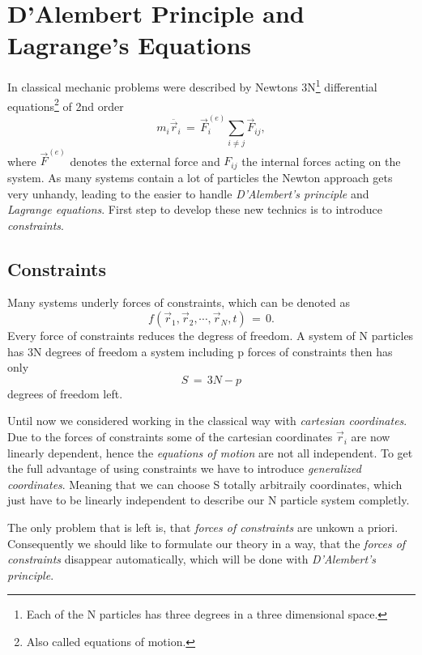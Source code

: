 \chapter{D'Alembert Principle and Lagrange's Equations}
In classical mechanic problems were described by Newtons 3N\footnote{Each of
the N particles has three degrees in a three dimensional space.} differential
equations\footnote{Also called equations of motion.} of 2nd order 
\begin{equation}
  m_i \ddot{\vec r_i} \,=\, \vec F_i^{(e)} \sum_{i \neq j} \vec F_{ij},
\end{equation}
where $\vec F^{(e)}$ denotes the external force and $F_{ij}$ the internal forces
acting on the system. As many systems contain a lot of particles the Newton
approach gets very unhandy, leading to the easier to handle \textit{D'Alembert's
principle} and \textit{Lagrange equations}. First step to develop these new
technics is to introduce \textit{constraints}. 

\section{Constraints}
Many systems underly forces of constraints, which can be denoted as 
\begin{equation}
  \label{holonomicConstraint}
  f(\vec r_1, \vec r_2, \cdots, \vec r_N, t) \,=\, 0.
\end{equation}
Every force of constraints reduces the degress of freedom. A system of N
particles has 3N degrees of freedom a system including p forces of
constraints then has only
\begin{equation}
  S \,=\, 3N - p
\end{equation}
degrees of freedom left. 

Until now we considered working in the classical way with \textit{cartesian
coordinates}. Due to the forces of constraints some of the cartesian coordinates $\vec
r_i$ are now linearly dependent, hence the \textit{equations of motion} are not
all independent. To get the full advantage of using constraints we have to
introduce \textit{generalized coordinates}. Meaning that we can choose S
totally arbitraily coordinates, which just have to be linearly
independent to describe our N particle system completly. 

The only problem that is left is, that \textit{forces of constraints} are
unkown a priori. Consequently we should like to formulate our theory in a way,
that the \textit{forces of constraints} disappear automatically, which will be 
done with \textit{D'Alembert's principle}. 

